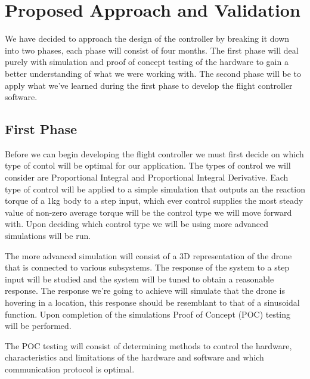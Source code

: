 \section{Proposed Approach and Validation}
We have decided to approach the design of the controller by breaking it down into two phases, each phase will consist of four months. The first phase will deal purely with simulation and proof of concept testing of the hardware to gain a better understanding of what we were working with. The second phase will be to apply what we've learned during the first phase to develop the flight controller software.

\subsection{First Phase}
Before we can begin developing the flight controller we must first decide on which type of contol will be optimal for our application. The types of control we will consider are Proportional Integral and Proportional Integral Derivative. Each type of control will be applied to a simple simulation that outputs an the reaction torque of a 1kg body to a step input, which ever control supplies the most steady value of non-zero average torque will be the control type we will move forward with. Upon deciding which control type we will be using more advanced simulations will be run.

The more advanced simulation will consist of a 3D representation of the drone that is connected to various subsystems. The response of the system to a step input will be studied and the system will be tuned to obtain a reasonable response. The response we're going to achieve will simulate that the drone is hovering in a location, this response should be resemblant to that of a sinusoidal function. Upon completion of the simulations Proof of Concept (POC) testing will be performed. 

The POC testing will consist of determining methods to control the hardware, characteristics and limitations of the hardware and software and which communication protocol is optimal. 

 
